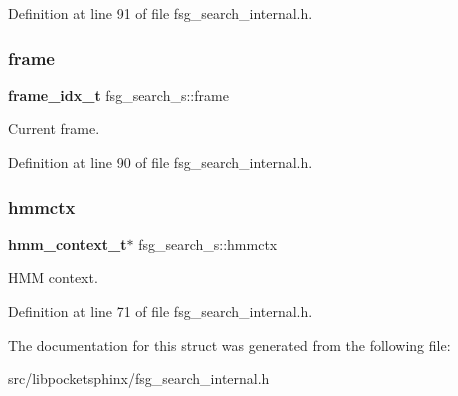 Definition at line 91 of file fsg\+\_\+search\+\_\+internal.\+h.

\mbox{\label{structfsg__search__s_acdac4164d14d531b14c11a823dd22893}} 
\subsubsection{frame}
{\footnotesize\ttfamily \textbf{ frame\+\_\+idx\+\_\+t} fsg\+\_\+search\+\_\+s\+::frame}



Current frame. 



Definition at line 90 of file fsg\+\_\+search\+\_\+internal.\+h.

\mbox{\label{structfsg__search__s_a7407bdf5f311caf9d46817b3387b798c}} 
\subsubsection{hmmctx}
{\footnotesize\ttfamily \textbf{ hmm\+\_\+context\+\_\+t}$\ast$ fsg\+\_\+search\+\_\+s\+::hmmctx}



H\+MM context. 



Definition at line 71 of file fsg\+\_\+search\+\_\+internal.\+h.



The documentation for this struct was generated from the following file\+:\begin{DoxyCompactItemize}
\item 
src/libpocketsphinx/fsg\+\_\+search\+\_\+internal.\+h\end{DoxyCompactItemize}
